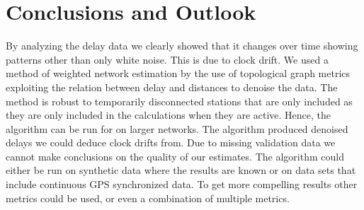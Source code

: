 \documentclass[12pt,a4paper,english]{article}
\begin{document}
\section{Conclusions and Outlook}
By analyzing the delay data we clearly showed that it changes over time showing patterns other than only white noise. This is due to clock drift. We used a method of weighted network estimation by the use of
topological graph metrics exploiting the relation between delay and distances to denoise the data. The method is robust to temporarily disconnected stations that are only included as they are only included in the calculations when they are active. Hence, the algorithm can be run for on larger networks. The algorithm produced denoised delays we could deduce clock drifts from. Due to missing validation data we cannot make conclusions on the quality of our estimates. The algorithm could either be run on synthetic data where the results are known or on data sets that include continuous GPS synchronized data. To get more compelling results other metrics could be used, or even a combination of multiple metrics.

  
   
\end{document}
